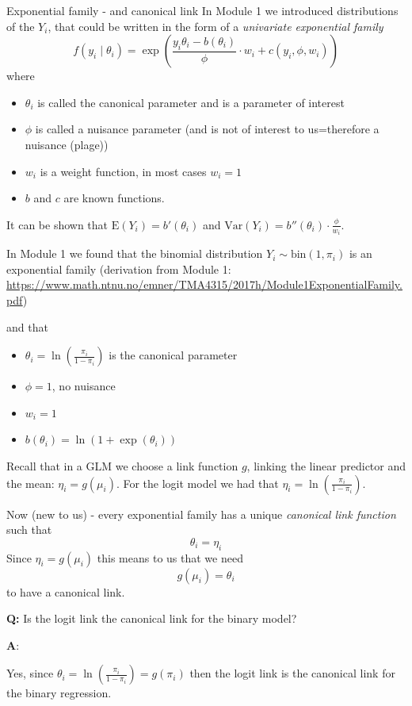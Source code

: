 \documentclass[
  ignorenonframetext,
]{beamer}
\providecommand{\tightlist}{%
  \setlength{\itemsep}{0pt}\setlength{\parskip}{0pt}}
\begin{document}
\begin{frame}{Exponential family - and canonical link}
\label{exponential-family---and-canonical-link}
In Module 1 we introduced distributions of the \(Y_i\), that could be
written in the form of a \emph{univariate exponential family}
\[ f(y_i\mid \theta_i)=\exp \left( \frac{y_i \theta_i-b(\theta_i)}{\phi}\cdot w_i + c(y_i, \phi, w_i) \right) \]
where

\begin{itemize}
\item
  \(\theta_i\) is called the canonical parameter and is a parameter of
  interest
\item
  \(\phi\) is called a nuisance parameter (and is not of interest to
  us=therefore a nuisance (plage))
\item
  \(w_i\) is a weight function, in most cases \(w_i=1\)
\item
  \(b\) and \(c\) are known functions.
\end{itemize}

It can be shown that \(\text{E}(Y_i)=b'(\theta_i)\) and
\(\text{Var}(Y_i)=b''(\theta_i)\cdot \frac{\phi}{w_i}\).
\end{frame}

\begin{frame}
In Module 1 we found that the binomial distribution
\(Y_i\sim \text{bin}(1,\pi_i)\) is an exponential family (derivation
from Module 1:
\url{https://www.math.ntnu.no/emner/TMA4315/2017h/Module1ExponentialFamily.pdf})

and that

\begin{itemize}
\tightlist
\item
  \(\theta_i=\ln( \frac{\pi_i}{1-\pi_i})\) is the canonical parameter
\item
  \(\phi=1\), no nuisance
\item
  \(w_i=1\)
\item
  \(b(\theta_i)=\ln(1+\exp(\theta_i))\)
\end{itemize}
\end{frame}

\begin{frame}
Recall that in a GLM we choose a link function \(g\), linking the linear
predictor and the mean: \(\eta_i=g(\mu_i)\). For the logit model we had
that \(\eta_i=\ln(\frac{\pi_i}{1-\pi_i})\).

Now (new to us) - every exponential family has a unique \emph{canonical
link function} such that \[\theta_i=\eta_i\] Since \(\eta_i=g(\mu_i)\)
this means to us that we need \[ g(\mu_i)=\theta_i\] to have a canonical
link.

\textbf{Q:} Is the logit link the canonical link for the binary model?

\textbf{A}:

Yes, since \(\theta_i=\ln( \frac{\pi_i}{1-\pi_i})=g(\pi_i)\) then the
logit link is the canonical link for the binary regression.
\end{frame}
\end{document}
